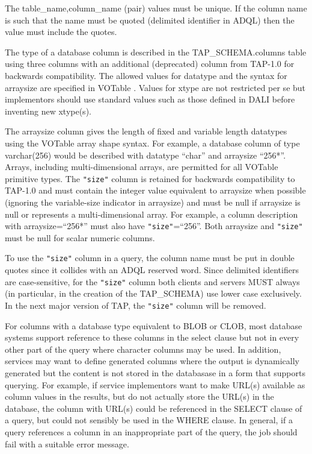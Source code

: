 \documentclass[11pt,letter]{ivoa}
\newcommand{\tapschema}{TAP\_SCHE\-MA}
\newcommand{\tapschema}{\mbox{%
  \relsize{-0.5}TAP\discretionary{-}{}{\kern-2pt\_}SCHEMA}}
\begin{document}
The table\_name,column\_name (pair) values must be unique. If the column name is such that 
the name must be quoted (delimited identifier in ADQL) then the value must include the quotes.

The type of a database column is described in the \tapschema.columns
table using three columns with an additional (deprecated) column from TAP-1.0 
for backwards compatibility. The allowed values for datatype and the syntax for arraysize
are specified in VOTable \citep{2013ivoa.spec.0920O}. Values for xtype are not restricted per se but 
implementors should use standard values such as those defined in DALI before 
inventing new xtype(s). 

The arraysize column gives the length of fixed and variable length datatypes using the VOTable
array shape syntax. For example, a database column of type varchar(256) would be 
described with datatype ``char'' and arraysize ``256*''. Arrays, including multi-dimensional 
arrays, are permitted for all VOTable primitive types. The \verb|"size"| column is retained for backwards
compatibility to TAP-1.0 and must contain the integer value equivalent to arraysize when 
possible (ignoring the variable-size indicator in arraysize) and must be null if arraysize is null or 
represents a multi-dimensional array. For example, a column description with arraysize=``256*'' must also have 
\verb|"size"|=``256''. Both arraysize and \verb|"size"| must be null for scalar numeric columns.

To use the \verb|"size"| column in a query, the column name must be put in double quotes since 
it collides with an ADQL reserved word. Since delimited identifiers are case-sensitive, for the 
\verb|"size"| column both
clients and servers MUST always (in particular, in the creation of the 
\tapschema) use lower case exclusively. In the next major version 
of TAP, the \verb|"size"| column will be removed.

For columns with a database type equivalent to BLOB or CLOB, most database systems support
reference to these columns in the select clause but not in every other part of the query where
character columns may be used. In addition, services may want to define generated columns where the output is dynamically generated but the content is not stored in the 
databasase in a form that supports querying. For example, if service implementors want to make
URL(s) available as column values in the results, but do not actually store the URL(s) in the
database, the column with URL(s) could be referenced in the SELECT clause of a query, but could
not sensibly be used in the WHERE clause. In general, if a query references a column in an 
inappropriate part of the query, the job should fail with a suitable error message.
\end{document}

